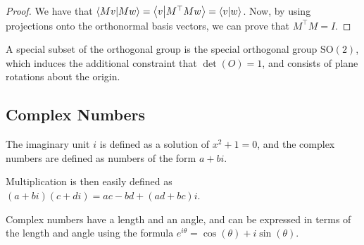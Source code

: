 \begin{proof}
    We have that $\braket{Mv}{Mw} = \braket{v}{M^\top M w} = \braket{v}{w}$. Now, by using projections onto the orthonormal basis vectors, we can prove that $M^\top M = I$.
\end{proof}

A special subset of the orthogonal group is the special orthogonal group $\mathrm{SO}(2)$, which induces the additional constraint that $\det(O) = 1$, and consists of plane rotations about the origin.

\subsection{Complex Numbers}

The imaginary unit $i$ is defined as a solution of $x^2 + 1 = 0$, and the complex numbers are defined as numbers of the form $a + bi$.

Multiplication is then easily defined as $(a + bi)(c + di) = ac - bd + (ad + bc)i$.

Complex numbers have a length and an angle, and can be expressed in terms of the length and angle using the formula $e^{i\theta} = \cos(\theta) + i\sin(\theta)$. 